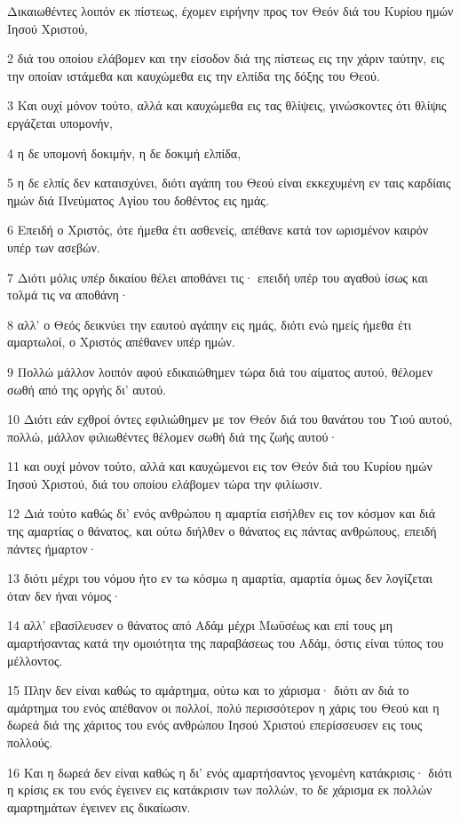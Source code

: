 \par Δικαιωθέντες λοιπόν εκ πίστεως, έχομεν ειρήνην προς τον Θεόν διά του Κυρίου ημών Ιησού Χριστού,
\par 2 διά του οποίου ελάβομεν και την είσοδον διά της πίστεως εις την χάριν ταύτην, εις την οποίαν ιστάμεθα και καυχώμεθα εις την ελπίδα της δόξης του Θεού.
\par 3 Και ουχί μόνον τούτο, αλλά και καυχώμεθα εις τας θλίψεις, γινώσκοντες ότι θλίψις εργάζεται υπομονήν,
\par 4 η δε υπομονή δοκιμήν, η δε δοκιμή ελπίδα,
\par 5 η δε ελπίς δεν καταισχύνει, διότι αγάπη του Θεού είναι εκκεχυμένη εν ταις καρδίαις ημών διά Πνεύματος Αγίου του δοθέντος εις ημάς.
\par 6 Επειδή ο Χριστός, ότε ήμεθα έτι ασθενείς, απέθανε κατά τον ωρισμένον καιρόν υπέρ των ασεβών.
\par 7 Διότι μόλις υπέρ δικαίου θέλει αποθάνει τις· επειδή υπέρ του αγαθού ίσως και τολμά τις να αποθάνη·
\par 8 αλλ' ο Θεός δεικνύει την εαυτού αγάπην εις ημάς, διότι ενώ ημείς ήμεθα έτι αμαρτωλοί, ο Χριστός απέθανεν υπέρ ημών.
\par 9 Πολλώ μάλλον λοιπόν αφού εδικαιώθημεν τώρα διά του αίματος αυτού, θέλομεν σωθή από της οργής δι' αυτού.
\par 10 Διότι εάν εχθροί όντες εφιλιώθημεν με τον Θεόν διά του θανάτου του Υιού αυτού, πολλώ, μάλλον φιλιωθέντες θέλομεν σωθή διά της ζωής αυτού·
\par 11 και ουχί μόνον τούτο, αλλά και καυχώμενοι εις τον Θεόν διά του Κυρίου ημών Ιησού Χριστού, διά του οποίου ελάβομεν τώρα την φιλίωσιν.
\par 12 Διά τούτο καθώς δι' ενός ανθρώπου η αμαρτία εισήλθεν εις τον κόσμον και διά της αμαρτίας ο θάνατος, και ούτω διήλθεν ο θάνατος εις πάντας ανθρώπους, επειδή πάντες ήμαρτον·
\par 13 διότι μέχρι του νόμου ήτο εν τω κόσμω η αμαρτία, αμαρτία όμως δεν λογίζεται όταν δεν ήναι νόμος·
\par 14 αλλ' εβασίλευσεν ο θάνατος από Αδάμ μέχρι Μωϋσέως και επί τους μη αμαρτήσαντας κατά την ομοιότητα της παραβάσεως του Αδάμ, όστις είναι τύπος του μέλλοντος.
\par 15 Πλην δεν είναι καθώς το αμάρτημα, ούτω και το χάρισμα· διότι αν διά το αμάρτημα του ενός απέθανον οι πολλοί, πολύ περισσότερον η χάρις του Θεού και η δωρεά διά της χάριτος του ενός ανθρώπου Ιησού Χριστού επερίσσευσεν εις τους πολλούς.
\par 16 Και η δωρεά δεν είναι καθώς η δι' ενός αμαρτήσαντος γενομένη κατάκρισις· διότι η κρίσις εκ του ενός έγεινεν εις κατάκρισιν των πολλών, το δε χάρισμα εκ πολλών αμαρτημάτων έγεινεν εις δικαίωσιν.
